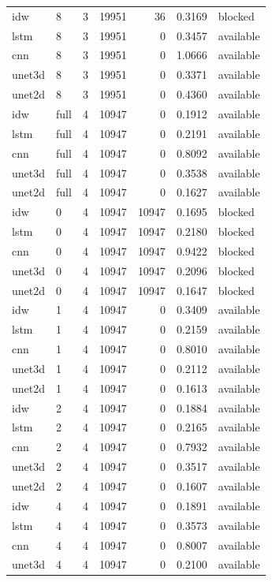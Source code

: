\begin{tabular}{llrrrrl}
idw & 8 & 3 & 19951 & 36 & 0.3169 & blocked \\
lstm & 8 & 3 & 19951 & 0 & 0.3457 & available \\
cnn & 8 & 3 & 19951 & 0 & 1.0666 & available \\
unet3d & 8 & 3 & 19951 & 0 & 0.3371 & available \\
unet2d & 8 & 3 & 19951 & 0 & 0.4360 & available \\
idw & full & 4 & 10947 & 0 & 0.1912 & available \\
lstm & full & 4 & 10947 & 0 & 0.2191 & available \\
cnn & full & 4 & 10947 & 0 & 0.8092 & available \\
unet3d & full & 4 & 10947 & 0 & 0.3538 & available \\
unet2d & full & 4 & 10947 & 0 & 0.1627 & available \\
idw & 0 & 4 & 10947 & 10947 & 0.1695 & blocked \\
lstm & 0 & 4 & 10947 & 10947 & 0.2180 & blocked \\
cnn & 0 & 4 & 10947 & 10947 & 0.9422 & blocked \\
unet3d & 0 & 4 & 10947 & 10947 & 0.2096 & blocked \\
unet2d & 0 & 4 & 10947 & 10947 & 0.1647 & blocked \\
idw & 1 & 4 & 10947 & 0 & 0.3409 & available \\
lstm & 1 & 4 & 10947 & 0 & 0.2159 & available \\
cnn & 1 & 4 & 10947 & 0 & 0.8010 & available \\
unet3d & 1 & 4 & 10947 & 0 & 0.2112 & available \\
unet2d & 1 & 4 & 10947 & 0 & 0.1613 & available \\
idw & 2 & 4 & 10947 & 0 & 0.1884 & available \\
lstm & 2 & 4 & 10947 & 0 & 0.2165 & available \\
cnn & 2 & 4 & 10947 & 0 & 0.7932 & available \\
unet3d & 2 & 4 & 10947 & 0 & 0.3517 & available \\
unet2d & 2 & 4 & 10947 & 0 & 0.1607 & available \\
idw & 4 & 4 & 10947 & 0 & 0.1891 & available \\
lstm & 4 & 4 & 10947 & 0 & 0.3573 & available \\
cnn & 4 & 4 & 10947 & 0 & 0.8007 & available \\
unet3d & 4 & 4 & 10947 & 0 & 0.2100 & available \\

\end{tabular}
